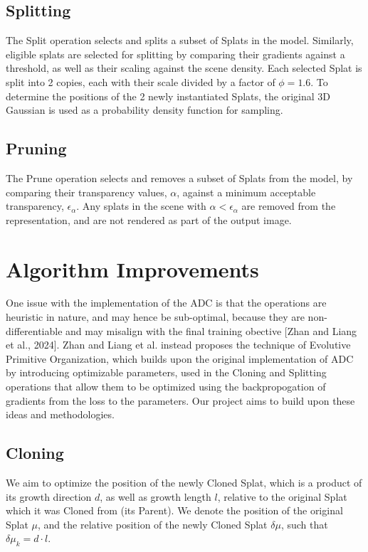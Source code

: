 \documentclass[11pt]{report}
\begin{document}
\subsection{Splitting}
The Split operation selects and splits a subset of Splats in the model. Similarly, eligible splats are selected for splitting by comparing their gradients against a threshold, as well as their scaling against the scene density. Each selected Splat is split into 2 copies, each with their scale divided by a factor of $\phi = 1.6$. To determine the positions of the 2 newly instantiated Splats, the original 3D Gaussian is used as a probability density function for sampling.

\subsection{Pruning}
\label{subsec:pruning}
The Prune operation selects and removes a subset of Splats from the model, by comparing their transparency values, $\alpha$, against a minimum acceptable transparency, $\epsilon_{\alpha}$. Any splats in the scene with $\alpha < \epsilon_{\alpha}$ are removed from the representation, and are not rendered as part of the output image.

\section{Algorithm Improvements}
One issue with the implementation of the ADC is that the operations are heuristic in nature, and may hence be sub-optimal, because they are non-differentiable and may misalign with the final training obective [Zhan and Liang et al., 2024]. Zhan and Liang et al. instead proposes the technique of Evolutive Primitive Organization, which builds upon the original implementation of ADC by introducing optimizable parameters, used in the Cloning and Splitting operations that allow them to be optimized using the backpropogation of gradients from the loss to the parameters. Our project aims to build upon these ideas and methodologies.

\subsection{Cloning}
We aim to optimize the position of the newly Cloned Splat, which is a product of its growth direction $d$, as well as growth length $l$, relative to the original Splat which it was Cloned from (its Parent). We denote the position of the original Splat $\mu$, and the relative position of the newly Cloned Splat $\delta \mu$, such that $\delta \mu_k = d\cdot l$.
\end{document}

